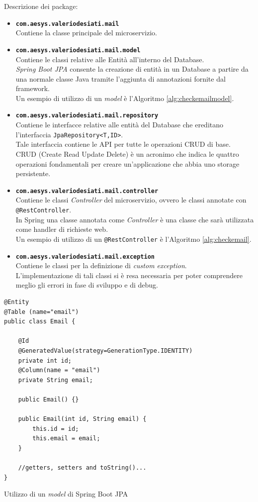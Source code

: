 Descrizione dei package:
\begin{itemize}
	\item \textbf{\texttt{com.aesys.valeriodesiati.mail}}\\ Contiene la classe principale del microservizio.
	\item \textbf{\texttt{com.aesys.valeriodesiati.mail.model}}\\ Contiene le classi relative alle Entità all'interno del Database.\\ \emph{Spring Boot JPA} consente la creazione di entità in un Database a partire da una normale classe Java tramite l'aggiunta di annotazioni fornite dal framework.\\Un esempio di utilizzo di un \emph{model} è l'Algoritmo \ref{alg:checkemailmodel}.
	\item \textbf{\texttt{com.aesys.valeriodesiati.mail.repository}}\\ Contiene le interfacce relative alle entità del Database che ereditano l'interfaccia \texttt{JpaRepository<T,ID>}.\\ Tale interfaccia contiene le API per tutte le operazioni CRUD di base.\\ CRUD (Create Read Update Delete) è un acronimo che indica le quattro operazioni fondamentali per creare un'applicazione che abbia uno storage persistente.
	\item \textbf{\texttt{com.aesys.valeriodesiati.mail.controller}}\\ Contiene le classi \emph{Controller} del microservizio, ovvero le classi annotate con \texttt{@RestController}.\\ In Spring una classe annotata come \emph{Controller} è una classe che sarà utilizzata come handler di richieste web.\\Un esempio di utilizzo di un \texttt{@RestController} è l'Algoritmo \ref{alg:checkemail}.
	\item \textbf{\texttt{com.aesys.valeriodesiati.mail.exception}}\\ Contiene le classi per la definizione di \emph{custom exception}.\\ L'implementazione di tali classi si è resa necessaria per poter comprendere meglio gli errori in fase di sviluppo e di debug.\\
\end{itemize}

\begin{algorithm}
\centering
\begin{verbatim}
@Entity
@Table (name="email")
public class Email {

	@Id
	@GeneratedValue(strategy=GenerationType.IDENTITY)
	private int id;
	@Column(name = "email")
	private String email;
	
	public Email() {}

	public Email(int id, String email) {
		this.id = id;
		this.email = email;
	}
	
	//getters, setters and toString()...
}
\end{verbatim}
\caption{Utilizzo di un \emph{model} di Spring Boot JPA}\label{alg:checkemailmodel}
\end{algorithm}

